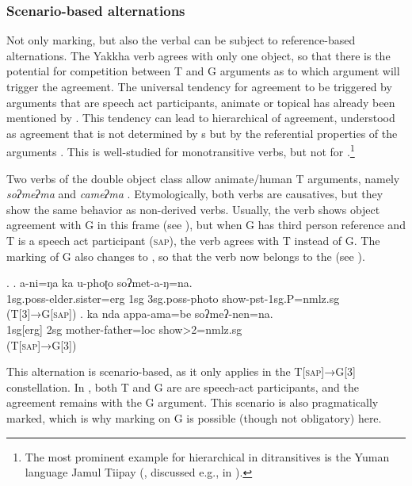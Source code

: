	
\subsubsection{Scenario-based alternations}\label{scen-based}

Not only  marking, but also the verbal  can be subject to reference-based alternations. The Yakkha verb agrees with only one object, so that there is the potential for competition between T and G arguments as to which argument will trigger the agreement. The universal tendency for agreement to be triggered by arguments that are speech act participants, animate or topical has  already been mentioned by \citet{Givon1976Topic}. This tendency can lead to hierarchical  of agreement, understood as agreement that is not determined by s but by the referential properties of the arguments \citep[66]{Nichols1992Language}. This is well-studied for monotransitive verbs, but not for .\footnote{The most prominent example for hierarchical  in ditransitives is the Yuman language Jamul Tiipay (\citealt[162--163]{Miller2001A-grammar}, discussed e.g., in \citealt[348]{Siewierska2003Person}).} 

Two verbs of the double object class allow animate/human T arguments, namely  \emph{soʔmeʔma}  and \emph{cameʔma} . Etymologically, both verbs are causatives, but they show the same behavior as non-derived verbs. Usually, the verb shows object agreement with G in this frame (see \Next[a]), but when G has third person reference and T is a speech act participant (\textsc{sap}), the verb agrees with T instead of G.  The  marking of G also changes to , so that the verb now belongs to the  (see \Next[b]).

\ex. \ag. a-ni=ŋa  ka  u-phoʈo soʔmet-a-ŋ=na.\\
		{\sc 1sg.poss-}elder.sister{\sc =erg} {\sc 1sg} {\sc 3sg.poss-}photo  show{\sc -pst-1sg.P=nmlz.sg}\\
	 (T[3]→G[\textsc{sap}])
\bg. ka nda appa-ama=be soʔmeʔ-nen=na.\\
		 {\sc 1sg[erg]}  {\sc 2sg}  mother-father{\sc =loc} show{>2=nmlz.sg}\\
		 (T[\textsc{sap}]→G[3])
		
This alternation is scenario-based, as it only applies in the T[\textsc{sap}]→G[3] constellation. In \Next, both T and G are are speech-act participants, and the agreement remains with the G argument. This scenario is also pragmatically marked, which is why  marking on G is possible (though not obligatory) here.
	

